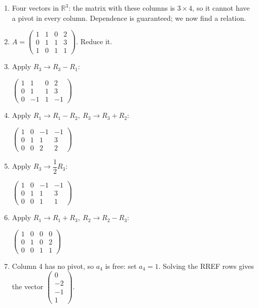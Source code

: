 \documentclass[11pt]{article}
\begin{document}
\begin{tcolorbox}[breakable,colback=ans,colframe=ansb,boxrule=0.5pt,left=4pt,right=4pt,top=2pt,bottom=2pt]\begin{enumerate}[leftmargin=2.2em,itemsep=1pt,topsep=1pt,label=\textbf{Step \arabic*.}]\item Four vectors in $\mathbb{R}^{3}$: the matrix with these columns is $3\times4$, so it cannot have a pivot in every column. Dependence is guaranteed; we now find a relation.
\item $A=\begin{pmatrix}1 & 1 & 0 & 2 \\ 0 & 1 & 1 & 3 \\ 1 & 0 & 1 & 1\end{pmatrix}$. Reduce it.
\item Apply $R_3\to R_3-R_1$:\par\smallskip $\displaystyle \begin{pmatrix}1 & 1 & 0 & 2 \\ 0 & 1 & 1 & 3 \\ 0 & -1 & 1 & -1\end{pmatrix}$
\item Apply $R_1\to R_1-R_2,\ R_3\to R_3+R_2$:\par\smallskip $\displaystyle \begin{pmatrix}1 & 0 & -1 & -1 \\ 0 & 1 & 1 & 3 \\ 0 & 0 & 2 & 2\end{pmatrix}$
\item Apply $R_3\to \dfrac{1}{2} R_3$:\par\smallskip $\displaystyle \begin{pmatrix}1 & 0 & -1 & -1 \\ 0 & 1 & 1 & 3 \\ 0 & 0 & 1 & 1\end{pmatrix}$
\item Apply $R_1\to R_1+R_3,\ R_2\to R_2-R_3$:\par\smallskip $\displaystyle \begin{pmatrix}1 & 0 & 0 & 0 \\ 0 & 1 & 0 & 2 \\ 0 & 0 & 1 & 1\end{pmatrix}$
\item Column 4 has no pivot, so $a_4$ is free: set $a_4=1$. Solving the RREF rows gives the vector $\begin{pmatrix}0\\-2\\-1\\1\end{pmatrix}$.

\end{enumerate}
\end{tcolorbox}
\end{document}
